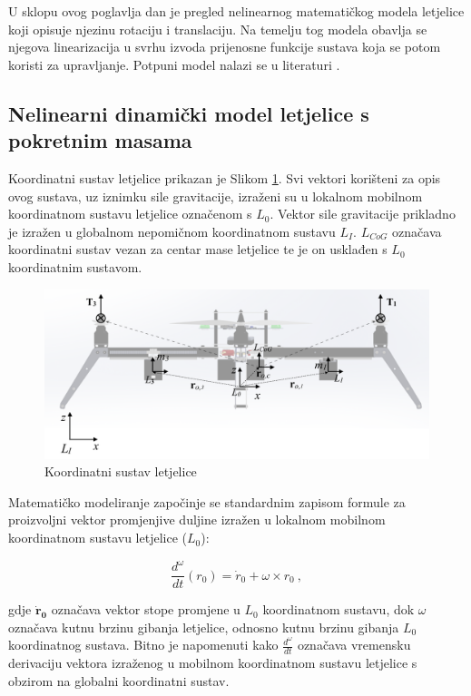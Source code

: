 \documentclass[11pt,a4paper]{article}
\begin{document}
U sklopu ovog poglavlja dan je pregled nelinearnog matematičkog modela letjelice koji opisuje njezinu rotaciju i translaciju. Na temelju tog modela obavlja se njegova linearizacija u svrhu izvoda prijenosne funkcije sustava koja se potom koristi za upravljanje. Potpuni model nalazi se u literaturi \cite{haus3}.

\medskip

\subsection{Nelinearni dinamički model letjelice s pokretnim masama}

Koordinatni sustav letjelice prikazan je Slikom \ref{fig:mod}. Svi vektori korišteni za opis ovog sustava, uz iznimku sile gravitacije, izraženi su u lokalnom mobilnom koordinatnom sustavu letjelice označenom s $L_{0}$. Vektor sile gravitacije prikladno je izražen u globalnom nepomičnom koordinatnom sustavu $L_{I}$. $L_{CoG}$ označava koordinatni sustav vezan za centar mase letjelice te je on usklađen s $L_{0}$ koordinatnim sustavom.


\begin{figure}[H]
	\centering
	\includegraphics[scale=0.23]{model}
	\caption{Koordinatni sustav letjelice}
	\label{fig:mod}
\end{figure}

Matematičko modeliranje započinje se standardnim zapisom formule za proizvoljni vektor promjenjive duljine izražen u lokalnom mobilnom koordinatnom sustavu letjelice ($L_{0}$):

\begin{equation}
\frac{d^{\omega}}{dt}({r}_{0}) =  {\dot{r}}_{0} + {\omega} \times {r}_{0} \ , 
\label{eq:r0}
\end{equation}

gdje $\boldsymbol{\dot{r}_{0}}$ označava vektor stope promjene u $L_{0}$ koordinatnom sustavu, dok $\omega$  označava kutnu brzinu gibanja letjelice, odnosno kutnu brzinu gibanja $L_{0}$ koordinatnog sustava. Bitno je napomenuti kako $\frac{d^{\omega}}{dt}$ označava vremensku derivaciju vektora izraženog u mobilnom koordinatnom sustavu letjelice s obzirom na globalni koordinatni sustav. 
\end{document}
